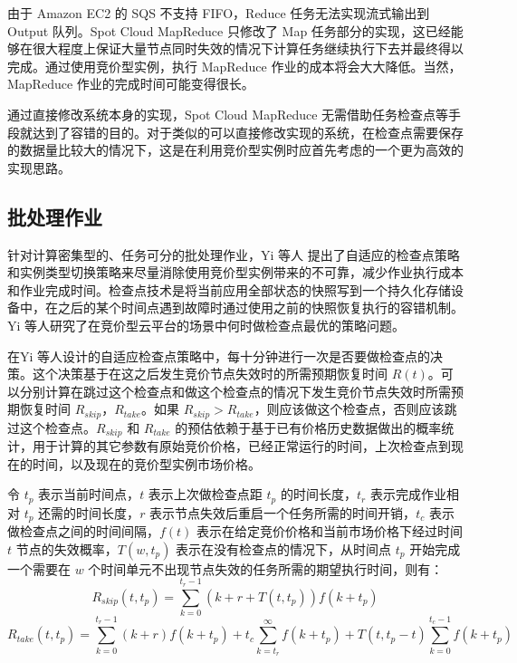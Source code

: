 由于 Amazon EC2 的 SQS 不支持 FIFO，Reduce 任务无法实现流式输出到 Output 队列。Spot Cloud MapReduce 只修改了 Map 任务部分的实现，这已经能够在很大程度上保证大量节点同时失效的情况下计算任务继续执行下去并最终得以完成。通过使用竞价型实例，执行 MapReduce 作业的成本将会大大降低。当然，MapReduce 作业的完成时间可能变得很长。

通过直接修改系统本身的实现，Spot Cloud MapReduce 无需借助任务检查点等手段就达到了容错的目的。对于类似的可以直接修改实现的系统，在检查点需要保存的数据量比较大的情况下，这是在利用竞价型实例时应首先考虑的一个更为高效的实现思路。

\subsection{批处理作业}
针对计算密集型的、任务可分的批处理作业，Yi 等人 \cite{Yi:2010:RCS:1844768.1845343, 5975137} 提出了自适应的检查点策略和实例类型切换策略来尽量消除使用竞价型实例带来的不可靠，减少作业执行成本和作业完成时间。检查点技术是将当前应用全部状态的快照写到一个持久化存储设备中，在之后的某个时间点遇到故障时通过使用之前的快照恢复执行的容错机制。Yi 等人研究了在竞价型云平台的场景中何时做检查点最优的策略问题。

在Yi 等人设计的自适应检查点策略中，每十分钟进行一次是否要做检查点的决策。这个决策基于在这之后发生竞价节点失效时的所需预期恢复时间 $R(t)$。可以分别计算在跳过这个检查点和做这个检查点的情况下发生竞价节点失效时所需预期恢复时间 $R_{skip}$，$R_{take}$。如果 $R_{skip} > R_{take}$，则应该做这个检查点，否则应该跳过这个检查点。$R_{skip}$ 和 $R_{take}$ 的预估依赖于基于已有价格历史数据做出的概率统计，用于计算的其它参数有原始竞价价格，已经正常运行的时间，上次检查点到现在的时间，以及现在的竞价型实例市场价格。

令 $t_p$ 表示当前时间点，$t$ 表示上次做检查点距 $t_p$ 的时间长度，$t_r$ 表示完成作业相对 $t_p$ 还需的时间长度，$r$ 表示节点失效后重启一个任务所需的时间开销，$t_c$ 表示做检查点之间的时间间隔，$f(t)$ 表示在给定竞价价格和当前市场价格下经过时间 $t$ 节点的失效概率，$T(w, t_p)$ 表示在没有检查点的情况下，从时间点 $t_p$ 开始完成一个需要在 $w$ 个时间单元不出现节点失效的任务所需的期望执行时间，则有：
\begin{equation}\label{eq_rskip}\nonumber 
R_{skip}(t, t_p) = \sum_{k=0}^{t_r - 1}(k + r + T(t,t_p))f(k+t_p)
\end{equation}
\begin{equation}\label{eq_rtake}\nonumber 
R_{take}(t, t_p) = \sum_{k=0}^{t_r - 1}(k + r)f(k+t_p) + t_c\sum_{k=t_r}^{\infty}f(k+t_p)+T(t,t_p-t)\sum_{k=0}^{t_c - 1}f(k+t_p)
\end{equation}

